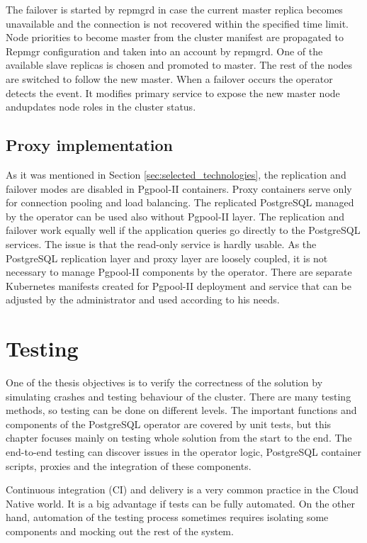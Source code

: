 \documentclass[
  digital, %
  twoside, %
  table,   %
  nolof,   %
  nolot,   %
]{fithesis3}
\begin{document}
The failover is started by repmgrd in case the current master replica becomes unavailable and the connection is not recovered within the specified time limit. Node priorities to become master from the cluster manifest are propagated to Repmgr configuration and taken into an account by repmgrd. One of the available slave replicas is chosen and promoted to master. The rest of the nodes are switched to follow the new master. When a failover occurs the operator detects the event. It modifies primary service to expose the new master node
andupdates node roles in the cluster status.

\section{Proxy implementation}
As it was mentioned in Section \ref{sec:selected_technologies}, the replication and failover modes are disabled in Pgpool-II containers. Proxy containers serve only for connection pooling and load balancing. The replicated PostgreSQL managed by the operator can be used also without Pgpool-II layer. The replication and failover work equally well if the application queries go directly to the PostgreSQL services. The issue is that the read-only service is hardly usable. As the PostgreSQL replication layer and proxy layer are loosely coupled, it is not necessary to manage Pgpool-II components by the operator. There are separate Kubernetes manifests created for Pgpool-II deployment and service that can be adjusted by the administrator and used according to his needs.


\chapter{Testing} \label{chap:testing}
One of the thesis objectives is to verify the correctness of the solution by simulating crashes and testing behaviour of the cluster. There are many testing methods, so testing can be done on different levels. The important functions and components of the PostgreSQL operator are covered by unit tests, but this chapter focuses mainly on testing whole solution from the start to the end. The end-to-end testing can discover issues in the operator logic, PostgreSQL container scripts, proxies and the integration of these components.

Continuous integration (CI) and delivery is a very common practice in the Cloud Native world. It is a big advantage if tests can be fully automated. On the other hand, automation of the testing process sometimes requires isolating some components and mocking out the rest of the system.
\end{document}
